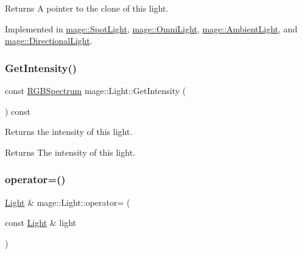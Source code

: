 \begin{DoxyReturn}{Returns}
A pointer to the clone of this light. 
\end{DoxyReturn}


Implemented in \hyperlink{classmage_1_1_spot_light_a060044ae1de97143878ad26524f03709}{mage\+::\+Spot\+Light}, \hyperlink{classmage_1_1_omni_light_a1212457828cdd96cc7170767b7bd1223}{mage\+::\+Omni\+Light}, \hyperlink{classmage_1_1_ambient_light_a7223a4770653c20e662810b0956c6e51}{mage\+::\+Ambient\+Light}, and \hyperlink{classmage_1_1_directional_light_a122d3dcd7633a85ef8a85e7d768da36d}{mage\+::\+Directional\+Light}.

\hypertarget{classmage_1_1_light_ad4ffb4c5fa06812e7d523a69b177d55a}{}\label{classmage_1_1_light_ad4ffb4c5fa06812e7d523a69b177d55a} 
\subsubsection{\texorpdfstring{Get\+Intensity()}{GetIntensity()}}
{\footnotesize\ttfamily const \hyperlink{structmage_1_1_r_g_b_spectrum}{R\+G\+B\+Spectrum} mage\+::\+Light\+::\+Get\+Intensity (\begin{DoxyParamCaption}{ }\end{DoxyParamCaption}) const\hspace{0.3cm}{\ttfamily [noexcept]}}

Returns the intensity of this light.

\begin{DoxyReturn}{Returns}
The intensity of this light. 
\end{DoxyReturn}
\hypertarget{classmage_1_1_light_ad1267c8d162e2cdead5e3a7d83cef3c1}{}\label{classmage_1_1_light_ad1267c8d162e2cdead5e3a7d83cef3c1} 
\subsubsection{\texorpdfstring{operator=()}{operator=()}\hspace{0.1cm}{\footnotesize\ttfamily [1/2]}}
{\footnotesize\ttfamily \hyperlink{classmage_1_1_light}{Light} \& mage\+::\+Light\+::operator= (\begin{DoxyParamCaption}\item[{const \hyperlink{classmage_1_1_light}{Light} \&}]{light }\end{DoxyParamCaption})\hspace{0.3cm}{\ttfamily [default]}}

